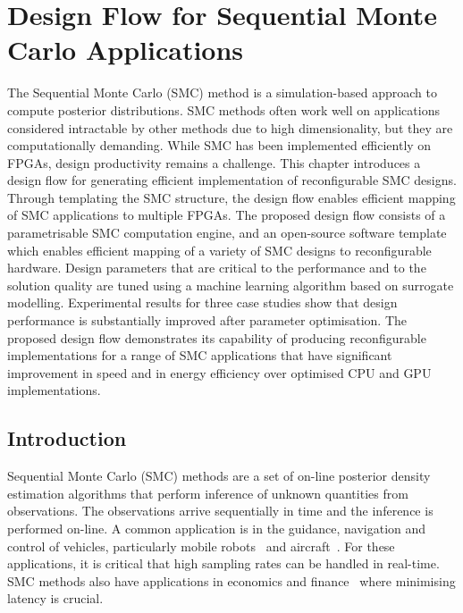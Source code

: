 
\chapter[Design Flow for SMC Applications]{Design Flow for Sequential Monte Carlo Applications}

The Sequential Monte Carlo (SMC) method is a simulation-based approach to compute posterior distributions.
SMC methods often work well on applications considered intractable by other methods due to high dimensionality, but they are computationally demanding. 
While SMC has been implemented efficiently on FPGAs, design productivity remains a challenge.
This chapter introduces a design flow for generating efficient implementation of reconfigurable SMC designs. 
Through templating the SMC structure, the design flow enables efficient mapping of SMC applications to multiple FPGAs.
The proposed design flow consists of a parametrisable SMC computation engine, and an open-source software template which enables efficient mapping of a variety of SMC designs to reconfigurable hardware.
Design parameters that are critical to the performance and to the solution quality are tuned using a machine learning algorithm based on surrogate modelling.
Experimental results for three case studies show that design performance is substantially improved after parameter optimisation. 
The proposed design flow demonstrates its capability of producing reconfigurable implementations for a range of SMC applications that have significant improvement in speed and in energy efficiency over optimised CPU and GPU implementations.

\section{Introduction}
\label{sec:intro}

Sequential Monte Carlo (SMC) methods are a set of on-line posterior density estimation algorithms that perform inference of unknown quantities from observations.
The observations arrive sequentially in time and the inference is performed on-line.
A common application is in the guidance, navigation and control of vehicles, particularly mobile robots~\cite{montemerlo02} and aircraft~\cite{kantas09}.
For these applications, it is critical that high sampling rates can be handled in real-time.
SMC methods also have applications in economics and finance~\cite{creal12} where minimising latency is crucial.
 
